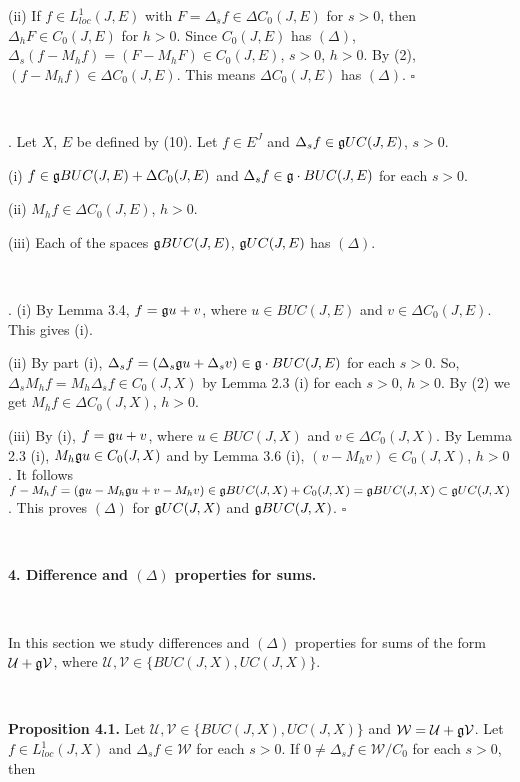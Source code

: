 \documentclass[10pt,onside,reqno]{amsart}
\newcommand{\U}{\mbox{${\mathcal U}$}}
\newcommand{\V}{\mbox{${\mathcal V}$}}
\newcommand{\W}{\mbox{${\mathcal W}$}}
\theoremstyle{remark}
\theoremstyle{definition}
\begin{document}
(ii) If $f \in L^1_{loc} (J,E)$  with $F= \Delta_s f \in \Delta C_0 (J,E)$ for $s > 0$, then $\Delta_h F \in C_0 (J,E)$ for $h > 0$.
Since  $C_0 (J,E)$ has $(\Delta)$, $\Delta_s (f- M_hf)= (F-M_h F)\in C_0 (J,E)$, $s >0$, $h>0$. By (2),  $(f- M_hf)\in \Delta C_0(J,E)$. This means $\Delta C_0(J,E)$ has $(\Delta)$.
 $\square$


\

. Let  $X$, $E$ be  defined by (10). Let $f \in E^J$  and $ \Delta_s f \in  \frak{g} UC (J,E)$, $s >0$.

(i) $f\in \frak{g}BUC(J,E) +\Delta C_0 (J,E)$ and
 $\Delta_s f \in\frak{g}\cdot BUC(J,E)$ for each $s>0$.

 (ii) $M_hf \in\Delta  C_0 (J,E)$,  $h > 0$.



(iii) Each of the spaces $\frak{g} BUC(J,E)$,  $\frak{g} UC(J,E)$  has $(\Delta)$.

\


. (i)  By Lemma 3.4, $f = \frak{g}u+ v$, where $u\in BUC(J,E)$ and $v\in \Delta C_0(J,E)$. This gives (i).

 (ii)  By part (i), $\Delta_s f= (\Delta_s \frak{g}u+\Delta_sv) \in\frak{g}\cdot BUC(J,E)$ for each $s>0$. So,
$ \Delta_s M_h f=M_h \Delta_s f \in C_0 (J,X)$ by Lemma 2.3 (i) for
each $s>0$, $h>0$. By (2) we get $M_hf \in\Delta  C_0 (J,X)$,  $h > 0$.

(iii) By (i),  $f = \frak{g}u+ v$, where $u\in BUC(J,X)$ and $v\in \Delta C_0(J,X)$. By Lemma 2.3 (i), $M_h \frak{g}u\in  C_0(J,X)$ and by Lemma 3.6 (i), $(v-M_h v)\in  C_0(J,X)$, $h >0$. It follows
$f-M_hf= (\frak{g}u - M_h \frak{g}u+ v-M_h v)\in \frak{g} BUC(J,X)+ C_0(J,X)= \frak{g} BUC(J,X)\subset \frak{g} UC(J,X)$.  This proves $(\Delta)$ for $\frak{g} UC(J,X)$ and $\frak{g} BUC(J,X)$. $\square$



\




\noindent\textbf{4. Difference and $(\Delta)$ properties for  sums.}

\

In this section we study differences and $(\Delta)$ properties for sums of the form $\U+\frak{g}\V$, where $\U, \V\in \{BUC(J,X), UC(J,X)\}$.

\

\noindent\textbf{Proposition 4.1.} Let $ \U, \V\in \{BUC(J,X), UC(J,X)\}$  and $ \W=\U+\frak {g} \V$. Let $f\in L^1_{loc}(J,X)$ and  $\Delta_s f
\in \W$ for each
 $s>0$.
 If $0 \not =\Delta_s f\in \W/C_0$ for each $s > 0$, then
\end{document}
